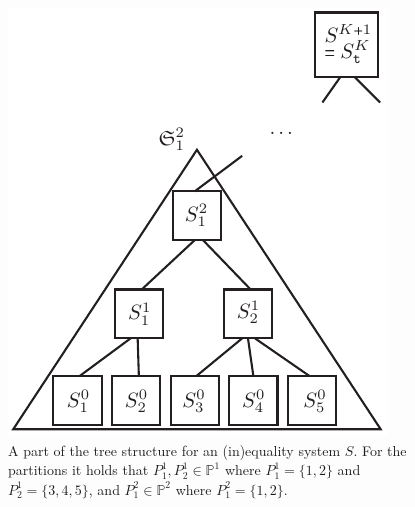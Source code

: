 \begin{figure}[htbp]
	\centering
		\includegraphics{figures/treeStructureSs.pdf}
	\caption{A part of the tree structure for an (in)equality system $S$. For the partitions it holds that $P^1_1, P^1_2\in \mathbb{P}^1$ where $P^1_1 = \{1,2\}$ and $P^1_2 =\{3,4,5\}$, and $P^2_1\in\mathbb{P}^2$ where $P^2_1=\{1,2\}$.}
	\label{fig:treeStructureSs}
\end{figure}

